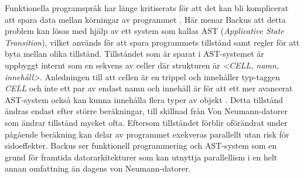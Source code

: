 \documentclass{TDP003mall}
\begin{document}
Funktionella programspråk har länge kritiserats för att det kan bli komplicerat att spara data mellan körningar av programmet \cite{backus_can_1978}. Här menar Backus \cite{backus_can_1978} att detta problem kan lösas med hjälp av ett system som kallas AST (\textit{Applicative State Transition}), vilket används för att spara programmets tillstånd samt regler för att byta mellan olika tillstånd. Tillståndet som är sparat i AST-systemet är uppbyggt internt som en sekvens av celler där strukturen är \textit{<CELL, namn, innehåll>}\cite{backus_can_1978}. Anledningen till att cellen är en trippel och innehåller typ-taggen \textit{CELL} och inte ett par av endast namn och innehåll är för att ett mer avancerat AST-system också kan kunna innehålla flera typer av objekt \cite{backus_can_1978}. Detta tillstånd ändras endast efter större beräkningar, till skillnad från Von Neumann-datorer som ändrar tillstånd mycket ofta\cite{backus_can_1978}. Eftersom tillståndet förblir oförändrat under pågående beräkning kan delar av programmet exekveras parallellt utan risk för sidoeffekter. Backus\cite{backus_can_1978} ser funktionell programmering och AST-system som en grund för framtida datorarkitekturer som kan utnyttja parallellism i en helt annan omfattning än dagens von Neumann-datorer.


\newpage


\end{document}
